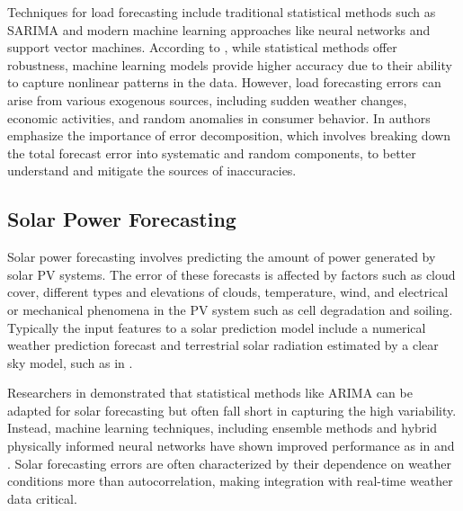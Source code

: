 \documentclass[conference]{IEEEtran}
\begin{document}
Techniques for load forecasting include traditional statistical methods such as SARIMA and modern machine learning approaches like neural networks and support vector machines. According to \cite{b1}, while statistical methods offer robustness, machine learning models provide higher accuracy due to their ability to capture nonlinear patterns in the data. However, load forecasting errors can arise from various exogenous sources, including sudden weather changes, economic activities, and random anomalies in consumer behavior. In \cite{b2} authors emphasize the importance of error decomposition, which involves breaking down the total forecast error into systematic and random components, to better understand and mitigate the sources of inaccuracies.

\subsection{Solar Power Forecasting}

Solar power forecasting involves predicting the amount of power generated by solar PV systems. The error of these forecasts is affected by factors such as cloud cover, different types and elevations of clouds, temperature, wind, and electrical or mechanical phenomena in the PV system such as cell degradation and soiling. Typically the input features to a solar prediction model include a numerical weather prediction forecast and terrestrial solar radiation estimated by a clear sky model, such as in \cite{b7}. 

Researchers in \cite{b3} demonstrated that statistical methods like ARIMA can be adapted for solar forecasting but often fall short in capturing the high variability. Instead, machine learning techniques, including ensemble methods and hybrid physically informed neural networks have shown improved performance as in \cite{b4} and \cite{b7}. Solar forecasting errors are often characterized by their dependence on weather conditions more than autocorrelation, making integration with real-time weather data critical.
\end{document}
